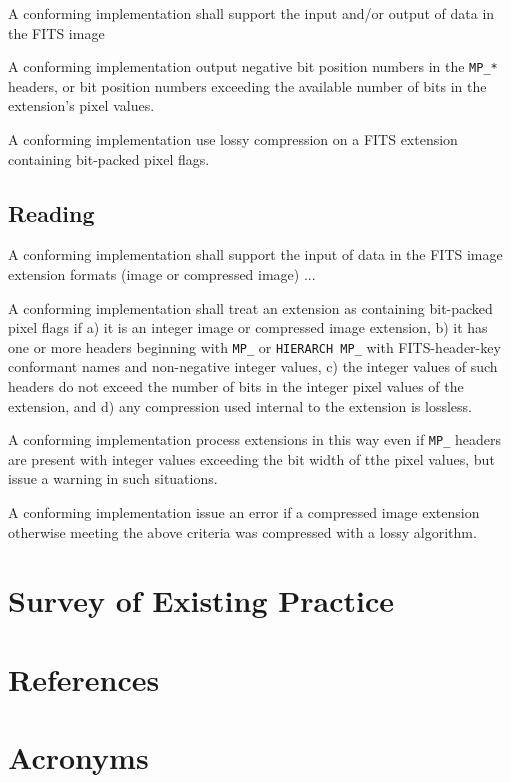 \documentclass[DM,authoryear,toc]{lsstdoc}
\begin{document}
A conforming implementation shall support the input and/or output of
data in the FITS image

A conforming implementation  output negative bit position
numbers in the \verb|MP_*| headers, or bit position numbers exceeding the
available number of bits in the extension's pixel values.

A conforming implementation  use lossy compression on
a FITS extension containing bit-packed pixel flags.

\subsection{Reading}

A conforming implementation shall support the input of data in the FITS
image extension formats (image or compressed image) ...

A conforming implementation shall treat an extension as containing
bit-packed pixel flags if a) it is an integer image or compressed image
extension, b) it has one or more headers beginning with \verb|MP_| or
\verb|HIERARCH MP_| with FITS-header-key conformant names and non-negative
integer values, c) the integer values of such headers do not exceed the
number of bits in the integer pixel values of the extension, and d) any
compression used internal to the extension is lossless.

A conforming implementation  process extensions in this way
even if \verb|MP_| headers are present with integer values exceeding the
bit width of tthe pixel values, but  issue a warning in
such situations.

A conforming implementation  issue an error if a compressed
image extension otherwise meeting the above criteria was compressed with a
lossy algorithm.


\section{Survey of Existing Practice}

\appendix
\section{References} \label{sec:bib}
\renewcommand{\refname}{} %


\section{Acronyms} \label{sec:acronyms}

\end{document}
